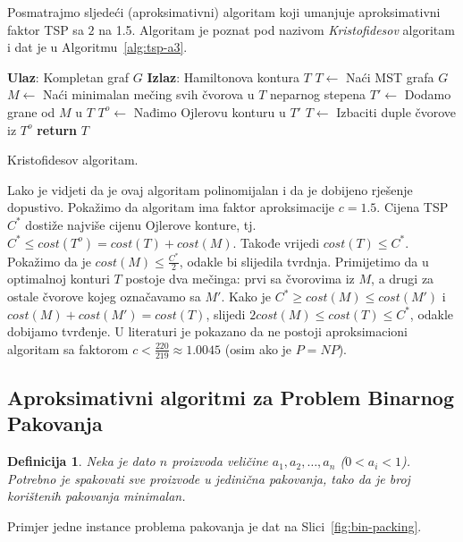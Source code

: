 \documentclass[a4paper, utf8, 11pt, colorlinks]{book}
\newtheorem{definition}{Definicija}
\begin{document}
Posmatrajmo sljedeći (aproksimativni) algoritam koji umanjuje aproksimativni faktor TSP sa $2$ na 1.5. Algoritam je poznat pod nazivom \emph{Kristofidesov} algoritam i dat je u Algoritmu~\ref{alg:tsp-a3}.

\begin{algorithm}[H] 

	\begin{algorithmic}[1]
		\STATE \textbf{Ulaz}: Kompletan graf $G$
		\STATE \textbf{Izlaz}: Hamiltonova kontura $T$ 
		\STATE $T \gets$ Naći MST grafa $G$
		\STATE $M \gets$ Naći minimalan mečing svih čvorova u $T$ neparnog stepena
		\STATE $T' \gets$ Dodamo grane od $M$ u $T$
		\STATE $T^o\gets$ Nađimo Ojlerovu konturu u $T'$
		\STATE $T \gets$ Izbaciti duple čvorove iz $T^o$
		\STATE \textbf{return} $T$
	\end{algorithmic}	
    \caption{Kristofidesov algoritam.}
    \label{alg:tsp-a3}
\end{algorithm}
  Lako je vidjeti da je ovaj algoritam polinomijalan i da je dobijeno rješenje dopustivo.
 Pokažimo da algoritam ima faktor aproksimacije $c=1.5$.  Cijena TSP $C^*$ dostiže najviše cijenu Ojlerove konture, tj.  $C^*\leq cost(T^o) = cost(T) + cost(M)$.  Takođe vrijedi $cost(T) \leq C^*$. Pokažimo da je $cost(M) \leq  \frac{C^*}{2}$, odakle bi slijedila tvrdnja. Primijetimo da u optimalnoj konturi $T$ postoje dva mečinga: prvi sa čvorovima iz $M$, a drugi za ostale čvorove kojeg označavamo sa $M'$. 
 Kako je $C^* \geq cost(M) \leq cost(M')$ i $cost(M) + cost(M') = cost(T)$, slijedi 
 $2 cost(M) \leq cost(T) \leq C^*$, odakle dobijamo tvrđenje.  U literaturi je pokazano da ne postoji  aproksimacioni algoritam sa faktorom  $c < \frac{220}{219} \approx 1.0045$ (osim ako je $P=NP$). 
 
 
 \subsection{Aproksimativni algoritmi za Problem Binarnog Pakovanja}
\begin{definition}
    Neka je dato $n$ proizvoda veličine $a_1,a_2,\ldots,a_n$ ($0<a_i<1$). Potrebno je spakovati sve proizvode u jedinična pakovanja, tako da je broj korištenih pakovanja minimalan.  
\end{definition} 

  Primjer jedne instance problema pakovanja je dat na Slici~\ref{fig:bin-packing}.
\end{document}

